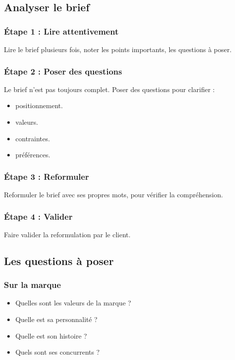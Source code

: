 \subsection{Analyser le brief}

\subsubsection{Étape 1 : Lire attentivement}

Lire le brief plusieurs fois, noter les points importants, les questions à poser.

\subsubsection{Étape 2 : Poser des questions}

Le brief n'est pas toujours complet. Poser des questions pour clarifier :

\begin{itemize}
    \item {} positionnement.
    \item {} valeurs.
    \item {} contraintes.
    \item {} préférences.
\end{itemize}

\subsubsection{Étape 3 : Reformuler}

Reformuler le brief avec ses propres mots, pour vérifier la compréhension.

\subsubsection{Étape 4 : Valider}

Faire valider la reformulation par le client.

\subsection{Les questions à poser}

\subsubsection{Sur la marque}

\begin{itemize}
    \item Quelles sont les valeurs de la marque ?
    \item Quelle est sa personnalité ?
    \item Quelle est son histoire ?
    \item Quels sont ses concurrents ?
\end{itemize}

